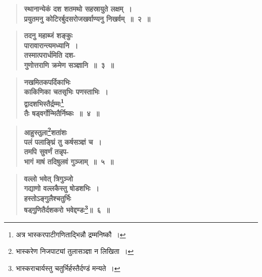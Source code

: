 \documentclass[11pt, openany]{book}
\begin{document}
 \label{1.2}
\begin{quote}
{\large \textbf{{\color{purple}स्थानान्येकं दश शतमथो सहस्रायुते लक्षम्~।\\
प्रयुतमनु कोटिरर्बुदसरोजखर्वाण्यनु निखर्वम्~॥~२~॥}}}
\end{quote}
\vspace{-6mm}

 \label{1.3}
\begin{quote}
{\large \textbf{{\color{purple}तदनु महाब्जं शङ्कुः \\
पारावारान्त्यमध्यानि~।\\ 
तस्मात्परार्धमिति दश-\\
गुणोत्तराणि क्रमेण सञ्ज्ञानि~॥~३~॥}}}
\end{quote}
\vspace{-6mm}

 \label{1.4}
\begin{quote}
{\large \textbf{{\color{purple}नखमितकपर्दिकाभिः\\
काकिणिका चतसृभिः पणस्ताभिः~।\\
द्वादशभिस्तैर्द्रम्मः\renewcommand{\thefootnote}{१}\footnote{अत्र भास्करपाटीगणिताद्भिन्नौ द्रम्मनिष्कौ~।}\\
तैः षड्वर्गोन्मितैर्निष्कः~॥~४~॥}}}
\end{quote}

\newpage
\setcounter{page}{2}

 \label{1.5}
\begin{quote}
{\large \textbf{{\color{purple}आहुस्तुला\renewcommand{\thefootnote}{१}\footnote{भास्करेण निजपाट्यां तुलासञ्ज्ञा न लिखिता~।}शतांशः\\
पलं पलाङ्घ्रिं तु कर्षसञ्ज्ञं च~।\\
तमपि सुवर्णं तन्नृप-\\
भागं माषं तदिषुलवं गुञ्जाम्~॥~५~॥}}}
\end{quote}
\vspace{-8mm}

 \label{1.6}
\begin{quote}
{\large \textbf{{\color{purple}वल्लो भवेत् त्रिगुञ्जो\\
गद्याणो वल्लकैस्तु षोडशभिः~।\\
हस्तोऽङ्गुलैश्चतुर्भिः\\
षड्गुणितैर्दशकरो भवेद्दण्डः\renewcommand{\thefootnote}{२}\footnote{भास्कराचार्यस्तु चतुर्भिर्हस्तैर्दण्डं मन्यते~।}॥~६~॥}}}
\end{quote}
\vspace{-8mm}
\end{document}
